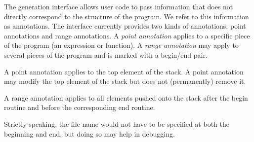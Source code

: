 \label{sec:annote}

The generation interface allows user code to pass information that
does not directly correspond to the structure of the program.  We
refer to this information as annotations.  The interface currently
provides two kinds of annotations: point annotations and range
annotations.  A \emph{point annotation} applies to a specific piece of
the program (\eg an expression or function).  A \emph{range
annotation} may apply to several pieces of the program and is marked
with a begin/end pair.  

A point annotation applies to the top element of the stack.  A point
annotation may modify the top element of the stack but does not
(permanently) remove it.


A range annotation applies to all elements pushed onto the stack after
the begin routine and before the corresponding end routine.

\begin{functionality}
Strictly speaking, the file name would not have to be specified at
both the beginning and end, but doing so may help in debugging.
\end{functionality}


